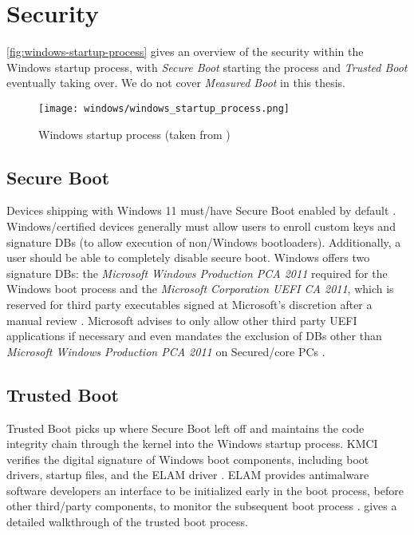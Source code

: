 
\section{Security}

\autoref{fig:windows-startup-process} gives an overview of the security within the Windows startup process, with \emph{Secure Boot} starting the process and \emph{Trusted Boot} eventually taking over.
We do not cover \emph{Measured Boot} in this thesis.

\begin{figure}[phtb]
    \centering
    \texttt{[image: windows/windows\_startup\_process.png]}
    \caption[Windows startup process]{Windows startup process (taken from \cite{microsoft-secure-the-windows-boot-process})}
    \label{fig:windows-startup-process}
\end{figure}

\subsection{Secure Boot}
Devices shipping with Windows 11 must\-/have Secure Boot enabled by default \cite{microsoft-windows-minimum-hardware-requirements-overview}.
Windows\-/certified devices generally must allow users to enroll custom keys and signature \acp{DB} (to allow execution of non\-/Windows bootloaders).
Additionally, a user should be able to completely disable secure boot.
Windows offers two signature \acp{DB}: the \emph{Microsoft Windows Production PCA 2011} required for the Windows boot process and the \emph{Microsoft Corporation \ac{UEFI} \ac{CA} 2011}, which is reserved for third party executables signed at Microsoft's discretion after a manual review \cite{microsoft-uefi-signing}.
Microsoft advises to only allow other third party \ac{UEFI} applications if necessary and even mandates the exclusion of \acp{DB} other than \emph{Microsoft Windows Production PCA 2011} on Secured\-/core \acp{PC} \cite{microsoft-secure-the-windows-boot-process}.

\subsection{Trusted Boot}
Trusted Boot picks up where Secure Boot left off and maintains the code integrity chain through the kernel into the Windows startup process.
\ac{KMCI} verifies the digital signature of Windows boot components, including boot drivers, startup files, and the \ac{ELAM} driver \cite{microsoft-trusted-boot}.
\ac{ELAM} provides antimalware software developers an interface to be initialized early in the boot process, before other third\-/party components, to monitor the subsequent boot process \cite{micosoft-windows-elam}.
\cite{understanding-windows-trusted-boot} gives a detailed walkthrough of the trusted boot process.

